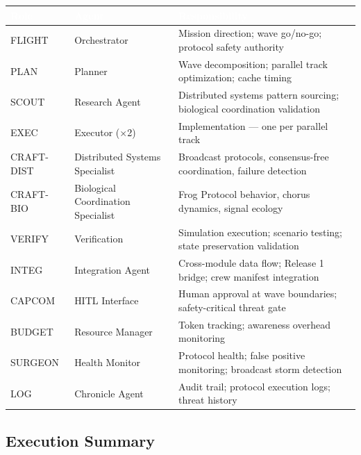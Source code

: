 \documentclass[11pt,letterpaper]{article}
\newcommand{\tableheader}[1]{\textbf{\sffamily\textcolor{white}{#1}}}
\begin{document}
\begin{center}
\begin{tabularx}{\textwidth}{L{2cm}L{3cm}X}
\toprule
{}
\tableheader{Role} & \tableheader{Agent} & \tableheader{Responsibility} \\
\midrule
FLIGHT & Orchestrator & Mission direction; wave go/no-go; protocol safety authority \\
PLAN & Planner & Wave decomposition; parallel track optimization; cache timing \\
SCOUT & Research Agent & Distributed systems pattern sourcing; biological coordination validation \\
EXEC & Executor ($\times$2) & Implementation --- one per parallel track \\
CRAFT-DIST & Distributed Systems Specialist & Broadcast protocols, consensus-free coordination, failure detection \\
CRAFT-BIO & Biological Coordination Specialist & Frog Protocol behavior, chorus dynamics, signal ecology \\
VERIFY & Verification & Simulation execution; scenario testing; state preservation validation \\
INTEG & Integration Agent & Cross-module data flow; Release 1 bridge; crew manifest integration \\
CAPCOM & HITL Interface & Human approval at wave boundaries; safety-critical threat gate \\
BUDGET & Resource Manager & Token tracking; awareness overhead monitoring \\
SURGEON & Health Monitor & Protocol health; false positive monitoring; broadcast storm detection \\
LOG & Chronicle Agent & Audit trail; protocol execution logs; threat history \\
\bottomrule
\end{tabularx}
\end{center}

\subsection{Execution Summary}
\end{document}
